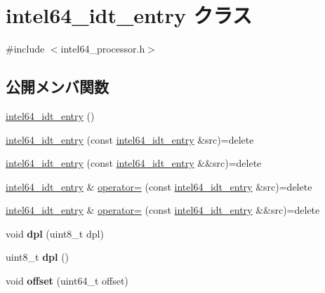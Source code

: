 \hypertarget{classintel64__idt__entry}{}\section{intel64\+\_\+idt\+\_\+entry クラス}
\label{classintel64__idt__entry}


{\ttfamily \#include $<$intel64\+\_\+processor.\+h$>$}

\subsection*{公開メンバ関数}
\begin{DoxyCompactItemize}
\item 
\hyperlink{classintel64__idt__entry_a5de85577bab9c8940d5fc6a85a49edb3}{intel64\+\_\+idt\+\_\+entry} ()
\item 
\hyperlink{classintel64__idt__entry_a9807a01902efadb7e54be2772b844f69}{intel64\+\_\+idt\+\_\+entry} (const \hyperlink{classintel64__idt__entry}{intel64\+\_\+idt\+\_\+entry} \&src)=delete
\item 
\hyperlink{classintel64__idt__entry_adddc31fcd79f148babda0d866db0cf47}{intel64\+\_\+idt\+\_\+entry} (const \hyperlink{classintel64__idt__entry}{intel64\+\_\+idt\+\_\+entry} \&\&src)=delete
\item 
\hyperlink{classintel64__idt__entry}{intel64\+\_\+idt\+\_\+entry} \& \hyperlink{classintel64__idt__entry_ad9f42b19a6d71b708afa406478c0754b}{operator=} (const \hyperlink{classintel64__idt__entry}{intel64\+\_\+idt\+\_\+entry} \&src)=delete
\item 
\hyperlink{classintel64__idt__entry}{intel64\+\_\+idt\+\_\+entry} \& \hyperlink{classintel64__idt__entry_a8f06154d5008db370f39a63600ed71a7}{operator=} (const \hyperlink{classintel64__idt__entry}{intel64\+\_\+idt\+\_\+entry} \&\&src)=delete
\item 
\hypertarget{classintel64__idt__entry_a44cf26db49c8d748b0a938c917f92cfb}{}\label{classintel64__idt__entry_a44cf26db49c8d748b0a938c917f92cfb} 
void {\bfseries dpl} (uint8\+\_\+t dpl)
\item 
\hypertarget{classintel64__idt__entry_a249c62d8f138cfeffa4a076aebca7a09}{}\label{classintel64__idt__entry_a249c62d8f138cfeffa4a076aebca7a09} 
uint8\+\_\+t {\bfseries dpl} ()
\item 
\hypertarget{classintel64__idt__entry_a64d4c35b617950088c2abad303904d0e}{}\label{classintel64__idt__entry_a64d4c35b617950088c2abad303904d0e} 
void {\bfseries offset} (uint64\+\_\+t offset)

\end{DoxyCompactItemize}
